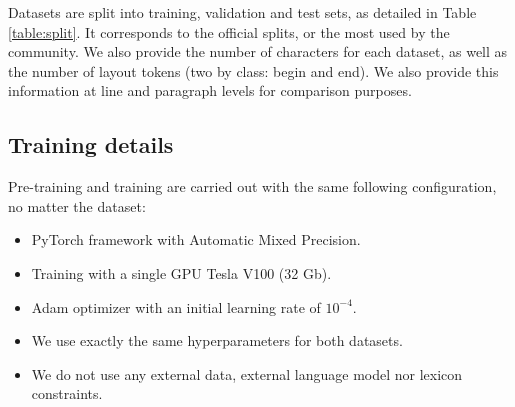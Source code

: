 Datasets are split into training, validation and test sets, as detailed in Table \ref{table:split}. It corresponds to the official splits, or the most used by the community. We also provide the number of characters for each dataset, as well as the number of layout tokens (two by class: begin and end). We also provide this information at line and paragraph levels for comparison purposes.

\begin{table}[h!]
    \caption{Datasets split in training, validation and test sets and associated number of tokens in their alphabet.}
    \centering
    \label{table:split}
\end{table}

\subsection{Training details}
Pre-training and training are carried out with the same following configuration, no matter the dataset:
\begin{itemize}
    \item PyTorch framework with Automatic Mixed Precision.
    \item Training with a single GPU Tesla V100 (32 Gb).
    \item Adam optimizer with an initial learning rate of $10^{-4}$.
    \item We use exactly the same hyperparameters for both datasets.
    \item We do not use any external data, external language model nor lexicon constraints.
\end{itemize}

